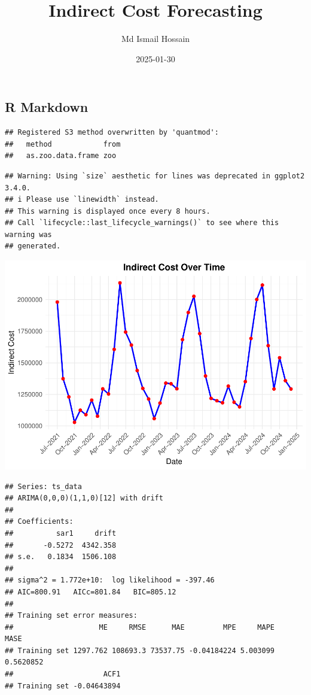 \documentclass[
]{article}
\title{Indirect Cost Forecasting}
\author{Md Ismail Hossain}
\date{2025-01-30}
\begin{document}
\maketitle

\subsection{R Markdown}\label{r-markdown}

\begin{verbatim}
## Registered S3 method overwritten by 'quantmod':
##   method            from
##   as.zoo.data.frame zoo
\end{verbatim}

\begin{verbatim}
## Warning: Using `size` aesthetic for lines was deprecated in ggplot2 3.4.0.
## i Please use `linewidth` instead.
## This warning is displayed once every 8 hours.
## Call `lifecycle::last_lifecycle_warnings()` to see where this warning was
## generated.
\end{verbatim}

\includegraphics{Indirect-Cost-Forecasting-Report_files/figure-latex/unnamed-chunk-1-1.pdf}

\begin{verbatim}
## Series: ts_data 
## ARIMA(0,0,0)(1,1,0)[12] with drift 
## 
## Coefficients:
##          sar1     drift
##       -0.5272  4342.358
## s.e.   0.1834  1506.108
## 
## sigma^2 = 1.772e+10:  log likelihood = -397.46
## AIC=800.91   AICc=801.84   BIC=805.12
## 
## Training set error measures:
##                    ME     RMSE      MAE         MPE     MAPE      MASE
## Training set 1297.762 108693.3 73537.75 -0.04184224 5.003099 0.5620852
##                     ACF1
## Training set -0.04643894
\end{verbatim}
\end{document}
